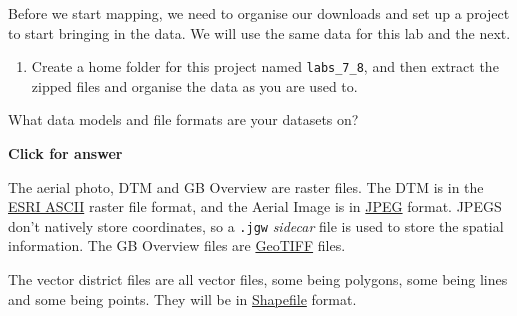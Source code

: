 \documentclass[
  letterpaper,
  DIV=11,
  numbers=noendperiod]{scrreprt}
\providecommand{\tightlist}{%
  \setlength{\itemsep}{0pt}\setlength{\parskip}{0pt}}\usepackage{longtable,booktabs,array}
\begin{document}
Before we start mapping, we need to organise our downloads and set up a
project to start bringing in the data. We will use the same data for
this lab and the next.

\begin{enumerate}
\def\labelenumi{(\arabic{enumi})}
\setcounter{enumi}{198}
\tightlist
\item
  Create a home folder for this project named \texttt{labs\_7\_8}, and
  then extract the zipped files and organise the data as you are used
  to.
\end{enumerate}

\begin{tcolorbox}[enhanced jigsaw, breakable, toptitle=1mm, colback=white, left=2mm, leftrule=.75mm, titlerule=0mm, colframe=quarto-callout-important-color-frame, opacityback=0, title=\textcolor{quarto-callout-important-color}{\faExclamation}\hspace{0.5em}{Stop and Think}, toprule=.15mm, opacitybacktitle=0.6, bottomtitle=1mm, colbacktitle=quarto-callout-important-color!10!white, bottomrule=.15mm, coltitle=black, rightrule=.15mm, arc=.35mm]

What data models and file formats are your datasets on?

\end{tcolorbox}

\begin{tcolorbox}[enhanced jigsaw, leftrule=.75mm, colframe=quarto-callout-important-color-frame, breakable, toprule=.15mm, bottomrule=.15mm, arc=.35mm, rightrule=.15mm, opacityback=0, colback=white, left=2mm]

\vspace{-3mm}\textbf{Click for answer}\vspace{3mm}

The aerial photo, DTM and GB Overview are raster files. The DTM is in
the \href{https://support.geocue.com/ascii-raster-files-asc/}{ESRI
ASCII} raster file format, and the Aerial Image is in
\href{https://en.wikipedia.org/wiki/JPEG}{JPEG} format. JPEGS don't
natively store coordinates, so a \texttt{.jgw} \emph{sidecar} file is
used to store the spatial information. The GB Overview files are
\href{https://www.ogc.org/standard/geotiff/}{GeoTIFF} files.

The vector district files are all vector files, some being polygons,
some being lines and some being points. They will be in
\href{https://en.wikipedia.org/wiki/Shapefile}{Shapefile} format.

\end{tcolorbox}
\end{document}
